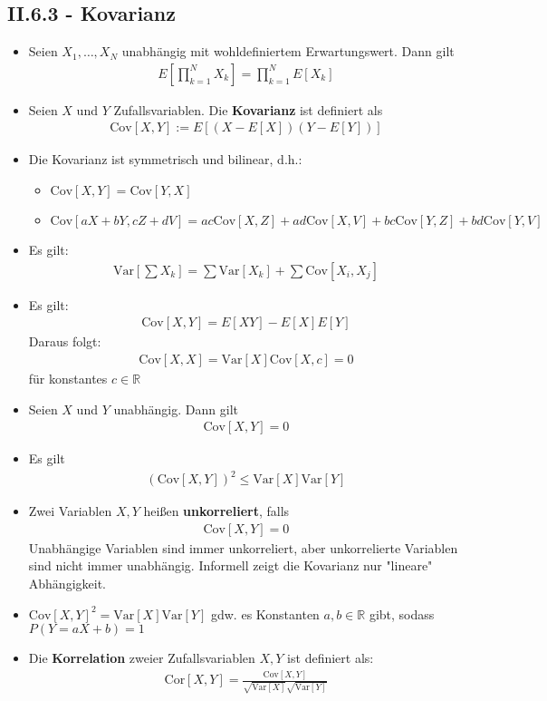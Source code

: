 \documentclass{scrartcl}
\newcommand{\real}{\mathbb{R}}
\newcommand{\var}{\text{Var}}
\newcommand{\cov}{\text{Cov}}
\newcommand{\cor}{\text{Cor}}
\begin{document}
\subsection*{II.6.3 - Kovarianz}
\begin{itemize}
    \item Seien $X_1,\hdots,X_N$ unabhängig mit wohldefiniertem Erwartungswert. Dann gilt
    \begin{align*}
        E\left[\prod_{k=1}^N X_k\right] = \prod_{k=1}^N E[X_k]
    \end{align*}
    \item Seien $X$ und $Y$ Zufallsvariablen. Die \textbf{Kovarianz} ist definiert als
    \begin{align*}
        \text{Cov}[X,Y] := E[(X - E[X])(Y - E[Y])]
    \end{align*}
    \item Die Kovarianz ist symmetrisch und bilinear, d.h.:
    \begin{itemize}
        \item $\cov[X,Y] = \cov[Y,X]$
        \item $\cov[aX + bY, cZ + dV] = ac\cov[X,Z] + ad\cov[X,V] + bc\cov[Y,Z] + bd\cov[Y,V]$
    \end{itemize}
    \item Es gilt:
    \begin{align*}
        \var\left[\sum X_k\right] = \sum \var[X_k] + \sum \cov[X_i,X_j]
    \end{align*}
    \item Es gilt:
    \begin{align*}
        \cov[X,Y] = E[XY] - E[X]E[Y]
    \end{align*}
    Daraus folgt:
    \begin{align*}
        \cov[X,X] = \var[X]
        \cov[X,c] = 0
    \end{align*}
    für konstantes $c \in \real$
    \item Seien $X$ und $Y$ unabhängig. Dann gilt
    \begin{align*}
        \cov[X,Y] = 0
    \end{align*}
    \item Es gilt
    \begin{align*}
        (\cov[X,Y])^2 \leq \var[X]\var[Y]
    \end{align*}
    \item Zwei Variablen $X,Y$ heißen \textbf{unkorreliert}, falls 
    \begin{align*}
        \cov[X,Y] = 0
    \end{align*}
    Unabhängige Variablen sind immer unkorreliert, aber unkorrelierte Variablen sind nicht immer unabhängig. Informell zeigt die Kovarianz nur "lineare" Abhängigkeit.
    \item $\cov[X,Y]^2 = \var[X]\var[Y]$ gdw. es Konstanten $a,b \in \real$ gibt, sodass $P(Y = aX + b) = 1$
    \item Die \textbf{Korrelation} zweier Zufallsvariablen $X,Y$ ist definiert als:
    \begin{align*}
        \cor[X,Y] = \frac{\cov[X,Y]}{\sqrt{\var[X]}\sqrt{\var[Y]}}
    \end{align*}
\end{itemize}
\end{document}
